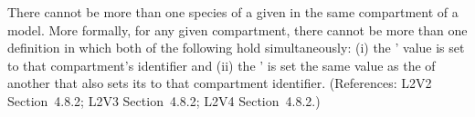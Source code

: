 There cannot be more than one species of a given \SpeciesType in the same
compartment of a model.  More formally, for any given compartment, there
cannot be more than one \Species definition in which both of the following
hold simultaneously: (i) the \Species'  value is set to
that compartment's identifier and (ii) the \Species'  is
set the same value as the  of another \Species that also
sets its  to that compartment identifier.  (References:
L2V2 Section~4.8.2; L2V3 Section~4.8.2; L2V4 Section~4.8.2.)
